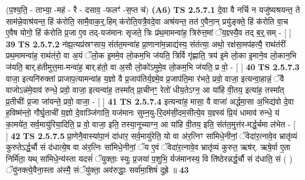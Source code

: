 \documentclass[17pt]{extarticle}
\begin{document}
                      (प॒श्य॒ति॒ - ताभ्या॒ -मह॑ - रै - दसाव॒ -फलꣳ॑ -स॒प्त च॑)  \textbf{(A6)} \newline \newline
                                        \textbf{ TS 2.5.7.1} \newline
                  दे॒वा वै नर्चि न यजु॑ष्यश्रयन्त॒ ते साम॑न्ने॒वाश्र॑यन्त॒ हिं क॑रोति॒ सामै॒वाक॒॒र्॒.हिम् क॑रोति॒यत्रै॒वदे॒वा अश्र॑यन्त॒ तत॑ ए॒वैना॒न् प्रयु॑ङ्क्ते॒ हिं क॑रोति वा॒च ए॒वैष योगो॒ हिं क॑रोति प्र॒जा ए॒व तद्-यज॑मानः सृजते॒ त्रिः प्र॑थ॒मामन्वा॑ह॒ त्रिरु॑त्त॒मां ॅय॒ज्ञ्स्यै॒व तद् ब॒र्॒.सम् - [  ] \textbf{  39} \newline
                  \newline
                                \textbf{ TS 2.5.7.2} \newline
                  न॑ह्य॒त्यप्र॑स्रꣳसाय॒ संत॑त॒मन्वा॑ह प्रा॒णाना॑म॒न्नाद्य॑स्य॒ संत॑त्या॒ अथो॒ रक्ष॑सा॒मप॑हत्यै॒ राथ॑तंरीं प्रथ॒मामन्वा॑ह॒ राथ॑तंरो॒ वा अ॒यं ॅलो॒क इ॒ममे॒व लो॒कम॒भि ज॑यति॒ त्रिर्वि गृ॑ह्णाति॒ त्रय॑ इ॒मे लो॒का इ॒माने॒व लो॒कान॒भि ज॑यति॒ बार्.ह॑तीमुत्त॒मा-मन्वा॑ह॒ बार्.ह॑तो॒ वा अ॒सौ लो॒को॑ऽमुमे॒व लो॒कम॒भि ज॑यति॒ प्र वो॒ - [  ] \textbf{  40} \newline
                  \newline
                                \textbf{ TS 2.5.7.3} \newline
                  वाजा॒ इत्यनि॑रुक्तां प्राजाप॒त्यामन्वा॑ह य॒ज्ञो वै प्र॒जाप॑तिर्य॒ज्ञ्मे॒व प्र॒जाप॑ति॒मा र॑भते॒ प्रवो॒ वाजा॒ इत्यन्वा॒हान्नं॒ ॅवै वाजोऽन्न॑मे॒वाव॑ रुन्धे॒ प्रवो॒ वाजा॒ इत्यन्वा॑ह॒ तस्मा᳚त् प्रा॒चीनꣳ॒॒ रेतो॑ धीय॒तेऽग्न॒ आ या॑हि वी॒तय॒ इत्या॑ह॒ तस्मा᳚त् प्र॒तीचीः᳚ प्र॒जा जा॑यन्ते॒ प्रवो॒ वाजा॒ - [  ] \textbf{  41} \newline
                  \newline
                                \textbf{ TS 2.5.7.4} \newline
                  इत्यन्वा॑ह॒ मासा॒ वै वाजा॑ अर्द्धमा॒सा अ॒भिद्य॑वो दे॒वा ह॒विष्म॑न्तो॒ गौर्घृ॒ताची॑ य॒ज्ञो दे॒वाञ्जि॑गाति॒ यज॑मानः सुम्न॒यु-रि॒दम॑सी॒दम॒सीत्ये॒व य॒ज्ञ्स्य॑ प्रि॒यं धामाव॑ रुन्धे॒ यं का॒मये॑त॒ सर्व॒मायु॑रिया॒दिति॒ प्र वो॒ वाजा॒ इति॒ तस्या॒नूच्याग्न॒ आ या॑हि वी॒तय॒ इति॒ संत॑त॒मुत्त॑र-मर्द्ध॒र्चमा ल॑भेत - [  ] \textbf{  42} \newline
                  \newline
                                \textbf{ TS 2.5.7.5} \newline
                  प्रा॒णेनै॒वास्या॑पा॒नं दा॑धार॒ सर्व॒मायु॑रेति॒ यो वा अ॑र॒त्निꣳ सा॑मिधे॒नीनां॒ ॅवेदा॑र॒त्नावे॒व भ्रातृ॑व्यं कुरुतेऽर्द्ध॒र्चौ सं द॑धात्ये॒ष वा अ॑र॒त्निः सा॑मिधे॒नीनां॒ ॅय ए॒वं ॅवेदा॑र॒त्नावे॒व भ्रातृ॑व्यं कुरुत॒ ऋष॑र्. ऋषे॒र्वा ए॒ता निर्मि॑ता॒ यथ् सा॑मिधे॒न्य॑स्ता यदसं॑ ॅयुक्ताः॒ स्युः प्र॒जया॑ प॒शुभि॒ र्यज॑मानस्य॒ वि ति॑ष्ठेरन्नर्द्ध॒र्चौ सं द॑धाति॒ सं ( ) ॅयु॑नक्त्ये॒वैना॒स्ता अ॑स्मै॒ संॅयु॑क्ता॒ अव॑रुद्धाः॒ सर्वा॑मा॒शिषं॑ दुह्रे ॥ \textbf{  43 } \newline
\end{document}
